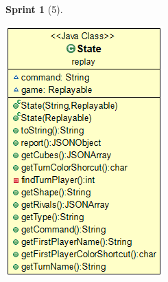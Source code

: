 \documentclass{article}
\theoremstyle{break}
\newtheorem*{sprint}{Sprint}
\begin{document}
\begin{sprint}[5]
\begin{center}
\includegraphics[scale=0.5]{state-sprint5.png}
\end{center}

\end{sprint}
\end{document}
